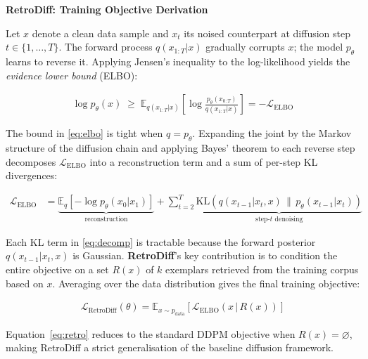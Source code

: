 \documentclass[11pt]{article}
\begin{document}
\pagestyle{empty}

\begin{center}
  {\large\bfseries RetroDiff: Training Objective Derivation}
\end{center}

\medskip

\noindent
Let $x$ denote a clean data sample and $x_t$ its noised counterpart at diffusion step $t \in \{1,\ldots,T\}$.
The forward process $q(x_{1:T}|x)$ gradually corrupts $x$; the model $p_\theta$ learns to reverse it.
Applying Jensen's inequality to the log-likelihood yields the \emph{evidence lower bound} (ELBO):

\begin{align}
  \log p_\theta(x) \;\geq\;
  \mathbb{E}_{q(x_{1:T}|x)}\!\left[\log\frac{p_\theta(x_{0:T})}{q(x_{1:T}|x)}\right]
  = -\mathcal{L}_{\mathrm{ELBO}}
  \label{eq:elbo}
\end{align}

\noindent
The bound in \eqref{eq:elbo} is tight when $q = p_\theta$.
Expanding the joint by the Markov structure of the diffusion chain and applying Bayes' theorem
to each reverse step decomposes $\mathcal{L}_{\mathrm{ELBO}}$ into a reconstruction term and
a sum of per-step KL divergences:

\begin{align}
  \mathcal{L}_{\mathrm{ELBO}}
  &= \underbrace{\mathbb{E}_q\!\left[-\log p_\theta(x_0|x_1)\right]}_{\text{reconstruction}}
  + \sum_{t=2}^{T}
    \underbrace{\mathrm{KL}\!\left(q(x_{t-1}|x_t,x)\,\|\,p_\theta(x_{t-1}|x_t)\right)}_{\text{step-}t\text{ denoising}}
  \label{eq:decomp}
\end{align}

\noindent
Each KL term in \eqref{eq:decomp} is tractable because the forward posterior
$q(x_{t-1}|x_t,x)$ is Gaussian.
\textbf{RetroDiff}'s key contribution is to condition the entire objective on a set
$R(x)$ of $k$ exemplars retrieved from the training corpus based on $x$.
Averaging over the data distribution gives the final training objective:

\begin{align}
  \mathcal{L}_{\mathrm{RetroDiff}}(\theta)
  = \mathbb{E}_{x \sim p_{\mathrm{data}}}\!\left[
      \mathcal{L}_{\mathrm{ELBO}}\!\left(x \,\big|\, R(x)\right)
    \right]
  \label{eq:retro}
\end{align}

\noindent
Equation~\eqref{eq:retro} reduces to the standard DDPM objective when $R(x) = \varnothing$,
making RetroDiff a strict generalisation of the baseline diffusion framework.
\end{document}
